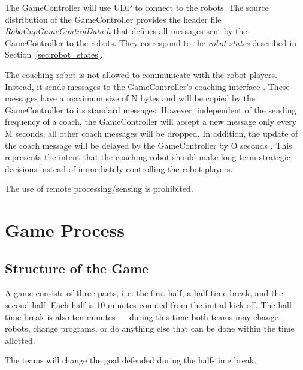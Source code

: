 \documentclass[12pt]{article}
\newcommand{\ie}{\mbox{i.\,e.}\xspace}
\begin{document}
The GameController will use UDP to connect to the robots. The source distribution of the GameController provides the header file \emph{RoboCupGameControlData.h} that defines all messages sent by the GameController to the robots. They correspond to the \emph{robot states} described in Section~\ref{sec:robot_states}.

The coaching robot is not allowed to communicate with the robot players. Instead, it sends messages to the GameController's coaching interface . These messages have a maximum size of N  bytes and will be copied by the GameController to its standard messages. However, independent of the sending frequency of a coach, the GameController will accept a new message only every M  seconds, all other coach messages will be dropped. In addition, the update of the coach message will be delayed by the GameController by O seconds . This represents the intent that the coaching robot should make long-term strategic decisions instead of immediately controlling the robot players.

The use of remote processing/sensing is prohibited.

\section{Game Process}

\subsection{Structure of the Game}
\label{sec:game_struct}

A game consists of three parts, \ie the first half, a half-time break, and the second half. Each half is 10 minutes counted from the initial kick-off. The half-time break is also ten minutes --- during this time both teams may change robots, change programs, or do anything else that can be done within the time allotted. 

The teams will change the goal defended during the half-time break.
\end{document}
